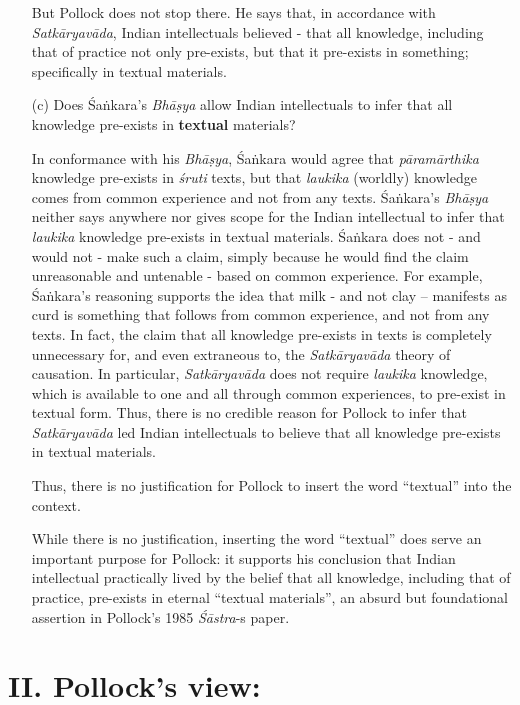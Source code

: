 \begin{itemize}
But Pollock does not stop there.  He says that, in accordance with {\sl Satkāryavāda}, Indian intellectuals believed - that all knowledge, including that of practice not only pre-exists, but that it pre-exists in something; specifically in textual materials.

\item[(c)] Does Śaṅkara's {\sl Bhāṣya} allow Indian intellectuals to infer that all knowledge pre-exists  in {\bf textual} materials?

In conformance with his {\sl Bhāṣya}, Śaṅkara would agree that {\sl pāramārthika} knowledge pre-exists in {\sl śruti} texts, but that {\sl laukika} (worldly) knowledge comes from common experience and not from any texts. Śaṅ\-kara's {\sl Bhāṣya} neither says anywhere nor gives scope for the Indian intellectual to infer that {\sl laukika} knowledge pre-exists in textual materials.  Śaṅkara does not - and would not - make such a claim, simply because he would find the claim unreasonable and untenable - based on common experience. For example, Śaṅkara's reasoning supports the idea that milk - and not clay -- manifests as curd is something that follows from common experience, and not from any texts. In fact, the claim that all knowledge pre-exists in texts is completely unnecessary for, and even extraneous to, the {\sl Satkāryavāda} theory of causation. In particular, {\sl Satkāryavāda} does not require {\sl laukika} knowledge, which is available to one and all through common experiences, to pre-exist in textual form. Thus, there is no credible reason for Pollock to infer that {\sl Satkāryavāda} led Indian intellectuals to believe that all knowledge pre-exists in textual materials.

Thus, there is no justification for Pollock to insert the word ``textual'' into the context.

While there is no justification, inserting the word ``textual'' does serve an important purpose for Pollock: it supports his conclusion that Indian intellectual practically lived by the belief that all knowledge, including that of practice, pre-exists in eternal ``textual materials'', an absurd but foundational assertion in Pollock's 1985 {\sl Śāstra}-s paper.
\end{itemize}


\section*{II. Pollock's view:}

